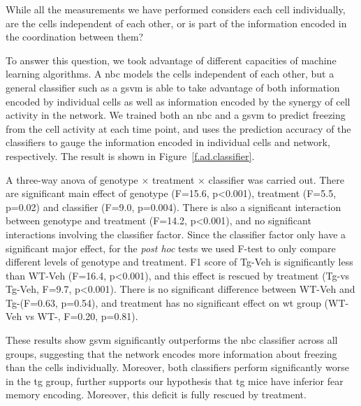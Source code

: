While all the measurements we have performed considers each cell individually, are the cells independent of each other, or is part of the information encoded in the coordination between them? 

To answer this question, we took advantage of different capacities of machine learning algorithms. A \gls{nbc} models the cells independent of each other, but a general classifier such as a \gls{gsvm} is able to take advantage of both information encoded by individual cells as well as information encoded by the synergy of cell activity in the network. We trained both an \gls{nbc} and a \gls{gsvm} to predict freezing from the cell activity at each time point, and uses the prediction accuracy of the classifiers to gauge the information encoded in individual cells and network, respectively. The result is shown in Figure~\ref{f.ad.classifier}. 

A three-way \gls{anova} of genotype $\times$ treatment $\times$ classifier was carried out. There are significant main effect of genotype (F=15.6, p<0.001), treatment (F=5.5, p=0.02) and classifier (F=9.0, p=0.004). There is also a significant interaction between genotype and treatment (F=14.2, p<0.001), and no significant interactions involving the classifier factor. Since the classifier factor only have a significant major effect, for the \textit{post hoc} tests we used F-test to only compare different levels of genotype and treatment. F1 score of Tg-Veh is significantly less than WT-Veh (F=16.4, p<0.001), and this effect is rescued by \tglu treatment (Tg-\glu vs Tg-Veh, F=9.7, p<0.001). There is no significant difference between WT-Veh and Tg-\glu (F=0.63, p=0.54), and \tglu treatment has no significant effect on \gls{wt} group (WT-Veh vs WT-\glu, F=0.20, p=0.81).  

These results show \gls{gsvm} significantly outperforms the \gls{nbc} classifier across all groups, suggesting that the network encodes more information about freezing than the cells individually. Moreover, both classifiers perform significantly worse in the \gls{tg} group, further supports our hypothesis that \gls{tg} mice have inferior fear memory encoding. Moreover, this deficit is fully rescued by \tglu treatment. 


